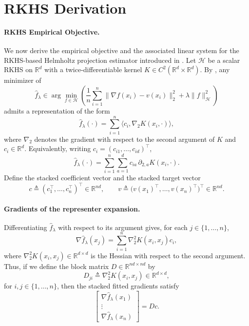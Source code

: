 \documentclass[11pt]{article}
\begin{document}
\section{RKHS Derivation} \label{sec: RKHS empirical objective derivation}

\paragraph{RKHS Empirical Objective.} 
We now derive the empirical objective and the associated linear system for the RKHS-based
Helmholtz projection estimator introduced in . Let $\mathcal{H}$ be a scalar RKHS on \(\mathbb{R}^d\) with a twice-differentiable kernel
\(K \in C^2(\mathbb{R}^d \times \mathbb{R}^d)\). By , any minimizer of
\[
\hat f_\lambda \in \arg\min_{f \in \mathcal{H}}
\left(
\frac{1}{n}\sum_{i=1}^n \|\nabla f(x_i) - v(x_i)\|_2^2
+ \lambda \|f\|_{\mathcal{H}}^2
\right)
\]
admits a representation of the form
\[
\hat f_\lambda(\cdot)
=
\sum_{i=1}^n \langle c_i, \nabla_2 K(x_i,\cdot)\rangle,
\]
where \(\nabla_2\) denotes the gradient with respect to the second argument of \(K\) and $c_i \in \mathbb{R}^d$.
Equivalently, writing \(c_i = (c_{i1},\dots,c_{id})^{\top}\),
\[
\hat f_\lambda(\cdot)
=
\sum_{i=1}^n \sum_{a=1}^d c_{ia}\,\partial_{2,a}K(x_i,\cdot).
\]
Define the stacked coefficient vector and the stacked target vector
\[
c \triangleq (c_1^{\top},\dots,c_n^{\top})^{\top} \in \mathbb{R}^{nd}, \qquad v \triangleq \bigl(v(x_1)^\top,\dots,v(x_n)^\top\bigr)^\top \in \mathbb{R}^{nd}.
\]
\paragraph{Gradients of the representer expansion.} Differentiating \(\hat f_\lambda\) with respect to its argument gives, for each \(j \in \{1,\dots,n\}\),
\[\nabla \hat f_\lambda(x_j)
=
\sum_{i=1}^n \nabla_2^2 K(x_i,x_j)c_i,
\]
where \(\nabla_2^2 K(x_i,x_j)\in\mathbb{R}^{d\times d}\) is the Hessian with respect to the
second argument. Thus, if we define the block matrix \(D \in \mathbb{R}^{nd\times nd}\) by
\[
D_{ji} \triangleq \nabla_2^2 K(x_i,x_j)\in\mathbb{R}^{d\times d},
\]
for $i,j \in \{1,\dots,n\}$, then the stacked fitted gradients satisfy
\[
\begin{bmatrix}
\nabla \hat f_\lambda(x_1)\\
\vdots\\
\nabla \hat f_\lambda(x_n)
\end{bmatrix}
=
Dc.
\]
\end{document}
